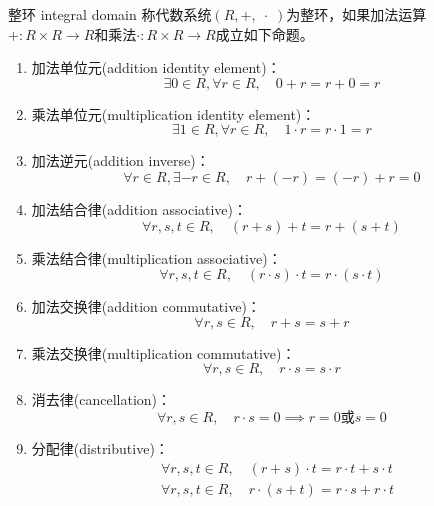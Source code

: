 \begin{definition}{整环 integral domain}
	称代数系统$(R,+,\;\cdot\;)$为整环，如果加法运算$+:R\times R\to R$和乘法$\cdot :R\times R\to R$成立如下命题。
	\begin{enumerate}
		\item 加法单位元(addition identity element)：
		$$
		\exists 0\in R,\forall r\in R,\quad 0+r=r+0=r
		$$
		\item 乘法单位元(multiplication identity element)：
		$$
		\exists 1\in R,\forall r\in R,\quad 1\cdot r=r\cdot 1=r
		$$
		\item 加法逆元(addition inverse)：
		$$
		\forall r\in R,\exists-r\in R,\quad r+(-r)=(-r)+r=0
		$$
		\item 加法结合律(addition associative)：
		$$
		\forall r,s,t\in R,\quad (r+s)+t=r+(s+t)
		$$
		\item 乘法结合律(multiplication associative)：
		$$
		\forall r,s,t\in R,\quad (r\cdot s)\cdot t=r\cdot (s\cdot t)
		$$
		\item 加法交换律(addition commutative)：
		$$
		\forall r,s\in R,\quad r+s=s+r
		$$
		\item 乘法交换律(multiplication commutative)：
		$$
		\forall r,s\in R,\quad r\cdot s=s\cdot r
		$$
		\item 消去律(cancellation)：
		$$
		\forall r,s\in R,\quad r\cdot s=0\implies r=0\text{或}s=0
		$$
		\item 分配律(distributive)：
		\begin{align*}
			&\forall r,s,t\in R,\quad (r+s)\cdot t=r\cdot t+s\cdot t\\
			&\forall r,s,t\in R,\quad r\cdot(s+t)=r\cdot s+r\cdot t
		\end{align*}
	\end{enumerate}
\end{definition}

